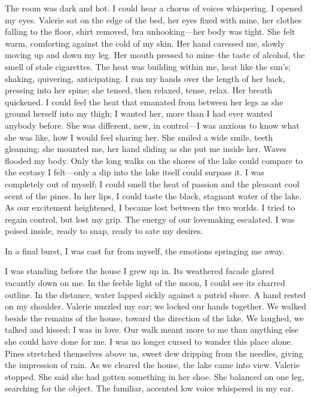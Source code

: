 \documentclass[
]{article}
\begin{document}
The room was dark and hot. I could hear a chorus of voices whispering. I
opened my eyes. Valerie sat on the edge of the bed, her eyes fixed with
mine, her clothes falling to the floor, shirt removed, bra
unhooking---her body was tight. She felt warm, comforting against the
cold of my skin. Her hand caressed me, slowly moving up and down my leg.
Her mouth pressed to mine--the taste of alcohol, the smell of stale
cigarettes. The heat was building within me, heat like the sun's;
shaking, quivering, anticipating. I ran my hands over the length of her
back, pressing into her spine; she tensed, then relaxed, tense, relax.
Her breath quickened. I could feel the heat that emanated from between
her legs as she ground herself into my thigh; I wanted her, more than I
had ever wanted anybody before. She was different, new, in control---I
was anxious to know what she was like, how I would feel sharing her. She
smiled a wide smile, teeth gleaming; she mounted me, her hand sliding as
she put me inside her. Waves flooded my body. Only the long walks on the
shores of the lake could compare to the ecstasy I felt---only a dip into
the lake itself could surpass it. I was completely out of myself; I
could smell the heat of passion and the pleasant cool scent of the
pines. In her lips, I could taste the black, stagnant water of the lake.
As our excitement heightened, I became lost between the two worlds. I
tried to regain control, but lost my grip. The energy of our lovemaking
escalated. I was poised inside, ready to snap, ready to sate my desires.

In a final burst, I was cast far from myself, the emotions springing me
away.

I was standing before the house I grew up in. Its weathered facade
glared vacantly down on me. In the feeble light of the moon, I could see
its charred outline. In the distance, water lapped sickly against a
putrid shore. A hand rested on my shoulder. Valerie nuzzled my ear; we
locked our hands together. We walked beside the remains of the house,
toward the direction of the lake. We laughed, we talked and kissed; I
was in love. Our walk meant more to me than anything else she could have
done for me. I was no longer cursed to wander this place alone. Pines
stretched themselves above us, sweet dew dripping from the needles,
giving the impression of rain. As we cleared the house, the lake came
into view. Valerie stopped. She said she had gotten something in her
shoe. She balanced on one leg, searching for the object. The familiar,
accented low voice whispered in my ear.
\end{document}
